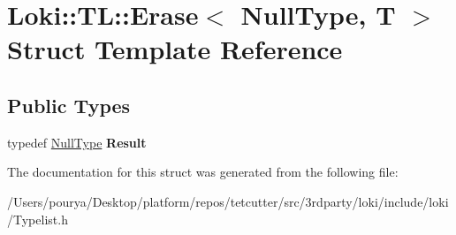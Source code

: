 \hypertarget{structLoki_1_1TL_1_1Erase_3_01NullType_00_01T_01_4}{}\section{Loki\+:\+:T\+L\+:\+:Erase$<$ Null\+Type, T $>$ Struct Template Reference}
\label{structLoki_1_1TL_1_1Erase_3_01NullType_00_01T_01_4}
\subsection*{Public Types}
\begin{DoxyCompactItemize}
\item 
\hypertarget{structLoki_1_1TL_1_1Erase_3_01NullType_00_01T_01_4_aae52284b70a3bc04393f00bad4a424d3}{}typedef \hyperlink{classLoki_1_1NullType}{Null\+Type} {\bfseries Result}\label{structLoki_1_1TL_1_1Erase_3_01NullType_00_01T_01_4_aae52284b70a3bc04393f00bad4a424d3}

\end{DoxyCompactItemize}


The documentation for this struct was generated from the following file\+:\begin{DoxyCompactItemize}
\item 
/\+Users/pourya/\+Desktop/platform/repos/tetcutter/src/3rdparty/loki/include/loki/Typelist.\+h\end{DoxyCompactItemize}
